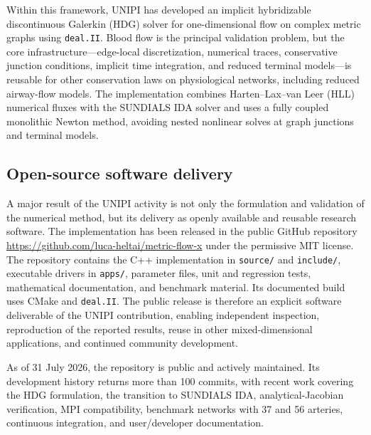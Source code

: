 \documentclass[a4paper,12pt]{article}
\begin{document}
Within this framework, UNIPI has developed an implicit hybridizable discontinuous Galerkin (HDG) solver for one-dimensional flow on complex metric graphs using \texttt{deal.II}. Blood flow is the principal validation problem, but the core infrastructure---edge-local discretization, numerical traces, conservative junction conditions, implicit time integration, and reduced terminal models---is reusable for other conservation laws on physiological networks, including reduced airway-flow models. The implementation combines Harten--Lax--van Leer (HLL) numerical fluxes with the \textsc{SUNDIALS} IDA solver and uses a fully coupled monolithic Newton method, avoiding nested nonlinear solves at graph junctions and terminal models.

\subsection{Open-source software delivery}

A major result of the UNIPI activity is not only the formulation and validation of the numerical method, but its delivery as openly available and reusable research software. The implementation has been released in the public GitHub repository \url{https://github.com/luca-heltai/metric-flow-x} under the permissive MIT license. The repository contains the C++ implementation in \texttt{source/} and \texttt{include/}, executable drivers in \texttt{apps/}, parameter files, unit and regression tests, mathematical documentation, and benchmark material. Its documented build uses CMake and \texttt{deal.II}. The public release is therefore an explicit software deliverable of the UNIPI contribution, enabling independent inspection, reproduction of the reported results, reuse in other mixed-dimensional applications, and continued community development.

As of 31 July 2026, the repository is public and actively maintained. Its development history returns more than 100 commits, with recent work covering the HDG formulation, the transition to \textsc{SUNDIALS} IDA, analytical-Jacobian verification, MPI compatibility, benchmark networks with 37 and 56 arteries, continuous integration, and user/developer documentation.
\end{document}
